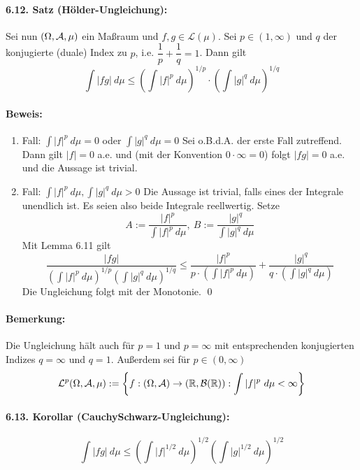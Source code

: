 \paragraph{6.12. Satz (H\"older-Ungleichung):} Sei nun $(\Omega,\mathcal{A},\mu)$ ein Ma\ss{}raum und $f,g\in\mathcal{L}(\mu)$. Sei $p\in(1,\infty)$ und $q$ der konjugierte (duale) Index zu $p$, i.e. $\dfrac{1}{p}+\dfrac{1}{q}=1$. Dann gilt 
$$\int |fg|\ d\mu\leq\left(\int |f|^p\ d\mu\right)^{1/p}\cdot\left(\int |g|^q\ d\mu\right)^{1/q}$$

\paragraph{Beweis:}
\begin{enumerate}[label=\Roman*.]
    \item Fall: $\int |f|^p\ d\mu=0$ oder $\int |g|^q\ d\mu=0$\newline
    Sei o.B.d.A. der erste Fall zutreffend. Dann gilt $|f|=0$ a.e. und (mit der Konvention $0\cdot\infty=0$) folgt $|fg|=0$ a.e. und die Aussage ist trivial.
    \item Fall: $\int |f|^p\ d\mu, \int |g|^q\ d\mu>0$\newline
    Die Aussage ist trivial, falls eines der Integrale unendlich ist. Es seien also beide Integrale reellwertig. Setze
    $$A:=\dfrac{|f|^p}{\displaystyle\int|f|^p\ d\mu},\ B:=\dfrac{|g|^q}{\displaystyle\int|g|^q\ d\mu}$$
    Mit Lemma 6.11 gilt 
    $$\dfrac{|fg|}{\displaystyle\left(\int|f|^p\ d\mu\right)^{1/p}\displaystyle\left(\int|g|^q\ d\mu\right)^{1/q}}\leq\dfrac{|f|^p}{p\cdot\left(\displaystyle\int |f|^p\ d\mu\right)}+\dfrac{|g|^q}{q\cdot\left(\displaystyle\int |g|^q\ d\mu\right)}$$
    Die Ungleichung folgt mit der Monotonie. \qed
\end{enumerate}

\paragraph{Bemerkung:}Die Ungleichung h\"alt auch f\"ur $p=1$ und $p=\infty$ mit entsprechenden konjugierten Indizes $q=\infty$ und $q=1$. Au\ss{}erdem sei f\"ur $p\in(0,\infty)$
$$\mathcal{L}^p(\Omega,\mathcal{A},\mu):=\left\{f:(\Omega,\mathcal{A})\to(\mathbb{R},\mathcal{B}(\mathbb{R})):\int |f|^p\ d\mu<\infty\right\}$$

\paragraph{6.13. Korollar (Cauchy\textendash Schwarz-Ungleichung):}
$$\int |fg|\ d\mu\leq\left(\int |f|^{1/2}\ d\mu\right)^{1/2}\left(\int |g|^{1/2}\ d\mu\right)^{1/2}$$

